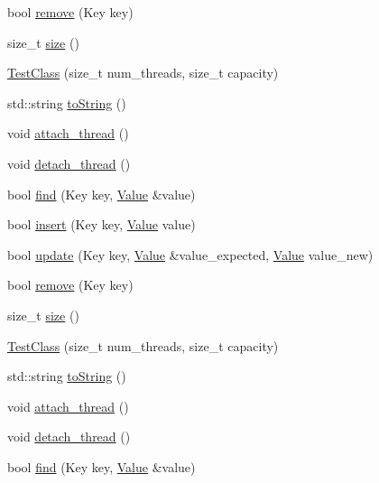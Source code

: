 \begin{DoxyCompactItemize}
\item 
bool \hyperlink{class_test_class_a3a22d60709c15d419f69d29b7de92d02}{remove} (Key key)
\item 
size\+\_\+t \hyperlink{class_test_class_af2230f298ab3ef4ebf71aa7afa3fb6ca}{size} ()
\item 
\hyperlink{class_test_class_ab3dbc7a67da46dda1125f7dee533aca2}{Test\+Class} (size\+\_\+t num\+\_\+threads, size\+\_\+t capacity)
\item 
std\+::string \hyperlink{class_test_class_a84e73a91ede625887472a307235d6de5}{to\+String} ()
\item 
void \hyperlink{class_test_class_a7e6bce4c39c047282ea8c1f1485a260b}{attach\+\_\+thread} ()
\item 
void \hyperlink{class_test_class_a79b3a395c8a1fac7a156228a27d829cc}{detach\+\_\+thread} ()
\item 
bool \hyperlink{class_test_class_af497b95115e81f882851b2ab843c298c}{find} (Key key, \hyperlink{hash__map_2test_object_8h_ad777bf08d8e2b01df17ba5e3c51ae11f}{Value} \&value)
\item 
bool \hyperlink{class_test_class_a0d075565ad4cccdb071bf267fe444681}{insert} (Key key, \hyperlink{hash__map_2test_object_8h_ad777bf08d8e2b01df17ba5e3c51ae11f}{Value} value)
\item 
bool \hyperlink{class_test_class_a4c33c8cac20119f9bee9b5091bc8a385}{update} (Key key, \hyperlink{hash__map_2test_object_8h_ad777bf08d8e2b01df17ba5e3c51ae11f}{Value} \&value\+\_\+expected, \hyperlink{hash__map_2test_object_8h_ad777bf08d8e2b01df17ba5e3c51ae11f}{Value} value\+\_\+new)
\item 
bool \hyperlink{class_test_class_a3a22d60709c15d419f69d29b7de92d02}{remove} (Key key)
\item 
size\+\_\+t \hyperlink{class_test_class_af2230f298ab3ef4ebf71aa7afa3fb6ca}{size} ()
\item 
\hyperlink{class_test_class_ab3dbc7a67da46dda1125f7dee533aca2}{Test\+Class} (size\+\_\+t num\+\_\+threads, size\+\_\+t capacity)
\item 
std\+::string \hyperlink{class_test_class_a84e73a91ede625887472a307235d6de5}{to\+String} ()
\item 
void \hyperlink{class_test_class_a7e6bce4c39c047282ea8c1f1485a260b}{attach\+\_\+thread} ()
\item 
void \hyperlink{class_test_class_a79b3a395c8a1fac7a156228a27d829cc}{detach\+\_\+thread} ()
\item 
bool \hyperlink{class_test_class_af497b95115e81f882851b2ab843c298c}{find} (Key key, \hyperlink{hash__map_2test_object_8h_ad777bf08d8e2b01df17ba5e3c51ae11f}{Value} \&value)

\end{DoxyCompactItemize}
